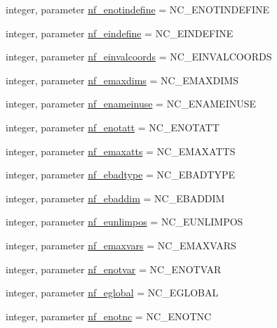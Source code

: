 \begin{DoxyCompactItemize}
integer, parameter \hyperlink{namespacenetcdf__nf__data_af90d8851a7c3d8fbd55997ef68d09ec9}{nf\+\_\+enotindefine} = N\+C\+\_\+\+E\+N\+O\+T\+I\+N\+D\+E\+F\+I\+NE
\item 
integer, parameter \hyperlink{namespacenetcdf__nf__data_a605e98de7b8cf91afd5986794875dc91}{nf\+\_\+eindefine} = N\+C\+\_\+\+E\+I\+N\+D\+E\+F\+I\+NE
\item 
integer, parameter \hyperlink{namespacenetcdf__nf__data_a55c688d94423d848be5bbefb3307e163}{nf\+\_\+einvalcoords} = N\+C\+\_\+\+E\+I\+N\+V\+A\+L\+C\+O\+O\+R\+DS
\item 
integer, parameter \hyperlink{namespacenetcdf__nf__data_a8af604876ca59d4505c87ea8d9968eb2}{nf\+\_\+emaxdims} = N\+C\+\_\+\+E\+M\+A\+X\+D\+I\+MS
\item 
integer, parameter \hyperlink{namespacenetcdf__nf__data_a4a03e9bf1ece300a2bcee59ee3ad0fbf}{nf\+\_\+enameinuse} = N\+C\+\_\+\+E\+N\+A\+M\+E\+I\+N\+U\+SE
\item 
integer, parameter \hyperlink{namespacenetcdf__nf__data_af496013ec552a295c4fa4e014891a966}{nf\+\_\+enotatt} = N\+C\+\_\+\+E\+N\+O\+T\+A\+TT
\item 
integer, parameter \hyperlink{namespacenetcdf__nf__data_ab9be355ae222094c53c1bbff6e648db0}{nf\+\_\+emaxatts} = N\+C\+\_\+\+E\+M\+A\+X\+A\+T\+TS
\item 
integer, parameter \hyperlink{namespacenetcdf__nf__data_a614f04ea82eeb283ca59cf2b0143bc26}{nf\+\_\+ebadtype} = N\+C\+\_\+\+E\+B\+A\+D\+T\+Y\+PE
\item 
integer, parameter \hyperlink{namespacenetcdf__nf__data_ae18a3d3c26e329679ea23b55347f5dab}{nf\+\_\+ebaddim} = N\+C\+\_\+\+E\+B\+A\+D\+D\+IM
\item 
integer, parameter \hyperlink{namespacenetcdf__nf__data_a4a2ed8a1310a7b608820c2a25ff76725}{nf\+\_\+eunlimpos} = N\+C\+\_\+\+E\+U\+N\+L\+I\+M\+P\+OS
\item 
integer, parameter \hyperlink{namespacenetcdf__nf__data_ad0b2c48b28569751246f1d01c6658709}{nf\+\_\+emaxvars} = N\+C\+\_\+\+E\+M\+A\+X\+V\+A\+RS
\item 
integer, parameter \hyperlink{namespacenetcdf__nf__data_acf95cccfbb55ab7c8dc98567c5f8cf27}{nf\+\_\+enotvar} = N\+C\+\_\+\+E\+N\+O\+T\+V\+AR
\item 
integer, parameter \hyperlink{namespacenetcdf__nf__data_a87eb232cfd09e28ccc6c8e7aa5111a44}{nf\+\_\+eglobal} = N\+C\+\_\+\+E\+G\+L\+O\+B\+AL
\item 
integer, parameter \hyperlink{namespacenetcdf__nf__data_aece9025a7d5d572776bab7fd9a695a96}{nf\+\_\+enotnc} = N\+C\+\_\+\+E\+N\+O\+T\+NC

\end{DoxyCompactItemize}
